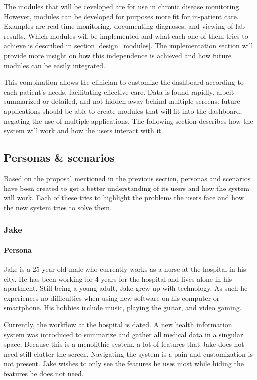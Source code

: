     The modules that will be developed are for use in chronic disease monitoring. However, modules can be developed for purposes more fit for in-patient care. Examples are real-time monitoring, documenting diagnoses, and viewing of lab results. Which modules will be implemented and what each one of them tries to achieve is described in section \ref{design_modules}. The implementation section will provide more insight on how this independence is achieved and how future modules can be easily integrated.

    This combination allows the clinician to customize the dashboard according to each patient's needs, facilitating effective care. Data is found rapidly, albeit summarized or detailed, and not hidden away behind multiple screens. future applications should be able to create modules that will fit into the dashboard, negating the use of multiple applications. The following section describes how the system will work and how the users interact with it.

    \subsection{Personas \& scenarios} \label{3_personas_scenarios}

    Based on the proposal mentioned in the previous section, personas and scenarios have been created to get a better understanding of its users and how the system will work. Each of these tries to highlight the problems the users face and how the new system tries to solve them.

        \subsubsection{Jake}

        \paragraph{Persona} Jake is a 25-year-old male who currently works as a nurse at the hospital in his city. He has been working for 4 years for the hospital and lives alone in his apartment. Still being a young adult, Jake grew up with technology. As such he experiences no difficulties when using new software on his computer or smartphone. His hobbies include music, playing the guitar, and video gaming.

        Currently, the workflow at the hospital is dated. A new health information system was introduced to summarize and gather all medical data in a singular space. Because this is a monolithic system, a lot of features that Jake does not need still clutter the screen. Navigating the system is a pain and customization is not present. Jake wishes to only see the features he uses most while hiding the features he does not need.
        
